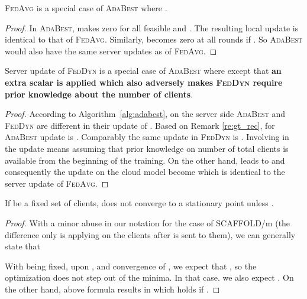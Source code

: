\documentclass[runningheads]{llncs}
\def\algref#1{Algorithm~\ref{#1}}
\newcommand{\fedavg}{\textsc{FedAvg}\xspace}
\newcommand{\scaffold}{\textsc{SCAFFOLD}\xspace}
\newcommand{\feddyn}{\textsc{FedDyn}\xspace}
\newcommand{\ours}{\textsc{AdaBest}\xspace}
\begin{document}
\vspace{0.6cm}

\begin{remark}
\fedavg is a special case of \ours where .

\begin{proof}
In \ours,  makes  zero for all feasible  and . The resulting local update is identical to that of \fedavg. Similarly,  becomes zero at all rounds if . So \ours would also have the same server updates as of \fedavg.  
\end{proof}

\vspace{0.6cm}

\end{remark}

\begin{remark}
Server update of \feddyn is a special case of \ours where  except that \textbf{an extra  scalar is applied which also adversely makes \feddyn require prior knowledge about the number of clients}.

\begin{proof}
According to \algref{alg:adabest}, on the server side \ours and \feddyn are different in their update of . Based on Remark \ref{re:gt_rec}, for  \ours update is . Comparably the same update in \feddyn is . Involving  in the update means assuming that prior knowledge on number of total clients is available from the beginning of the training. On the other hand,  leads to  and consequently the update on the cloud model become  which is identical to the server update of \fedavg.
\end{proof}

\end{remark}

\vspace{0.6cm}
\begin{theorem}
If  be a fixed set of clients,  does not converge to a stationary point unless .
\end{theorem}

\begin{proof}
With a minor abuse in our notation for the case of \scaffold/m (the difference only is applying  on the clients after  is sent to them), we can generally state that

With  being fixed, upon , and convergence of , we expect that , so the optimization does not step out of the minima.
In that case. we also expect . On the other hand, above formula results in  which holds if .
\end{proof}
\end{document}
